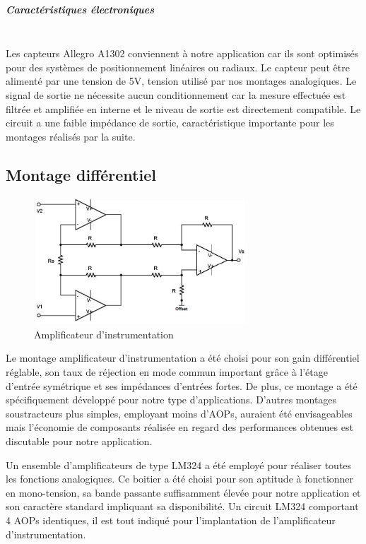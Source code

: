 \documentclass[11pt, french]{article} %
\begin{document}
\subparagraph*{Caractéristiques électroniques}~\\
Les capteurs Allegro A1302 conviennent à notre application car ils sont optimisés pour des systèmes de positionnement linéaires ou radiaux. Le capteur peut être alimenté par une tension de 5V, tension utilisé par nos montages analogiques. Le signal de sortie ne nécessite aucun conditionnement car la mesure effectuée est filtrée et amplifiée en interne et le niveau de sortie est directement compatible. Le circuit a une faible impédance de sortie, caractéristique importante pour les montages réalisés par la suite.

\subsection{Montage différentiel}

\begin{figure}
  \includegraphics[width=8cm]{SolutionAnalogique/AmpInst}
  \caption{Amplificateur d'instrumentation}
\end{figure}
Le montage amplificateur d'instrumentation a été choisi pour son gain différentiel réglable, son taux de réjection en mode commun important grâce à l'étage d'entrée symétrique et ses impédances d'entrées fortes. De plus, ce montage a été spécifiquement développé pour notre type d'applications. D'autres montages soustracteurs plus simples, employant moins d'AOPs, auraient été envisageables mais l'économie de composants réalisée en regard des performances obtenues est discutable pour notre application. 

Un ensemble d'amplificateurs de type LM324 a été employé pour réaliser toutes les fonctions analogiques. Ce boitier a été choisi pour son aptitude à fonctionner en mono-tension, sa bande passante suffisamment élevée pour notre application et son caractère standard impliquant sa disponibilité. Un circuit LM324 comportant 4 AOPs identiques, il est tout indiqué pour l'implantation de l'amplificateur d'instrumentation.
\end{document}
